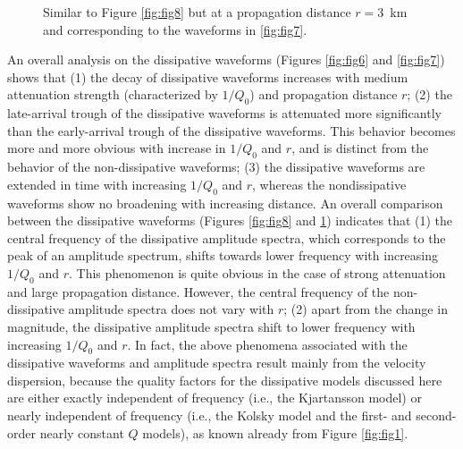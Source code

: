 \documentclass[article]{./macros/elsarticle_qh}
\begin{document}
\begin{figure}[H]
\centering
{}
\caption{
Similar to Figure \ref{fig:fig8} but at a propagation distance $r=3$~km and corresponding to the waveforms in \ref{fig:fig7}. 
}
\label{fig:fig9}
\end{figure}

An overall analysis on the dissipative waveforms (Figures \ref{fig:fig6} and \ref{fig:fig7}) shows that (1) the decay of dissipative waveforms increases with medium attenuation strength (characterized by $1/Q_{0}$) and propagation distance $r$; (2) the late-arrival trough of the dissipative waveforms is attenuated more significantly than the early-arrival trough of the dissipative waveforms. This behavior becomes more and more obvious with increase in $1/Q_{0}$ and $r$, and is distinct from the behavior of the non-dissipative waveforms; (3) the dissipative waveforms are extended in time with increasing $1/Q_{0}$ and $r$, whereas the nondissipative waveforms show no broadening with increasing distance. An overall comparison between the dissipative waveforms (Figures \ref{fig:fig8} and \ref{fig:fig9}) indicates that (1) the central frequency of the dissipative amplitude spectra, which corresponds to the peak of an amplitude spectrum, shifts towards lower frequency with increasing $1/Q_{0}$ and $r$. This phenomenon is quite obvious in the case of strong attenuation and large propagation distance. However, the central frequency of the non-dissipative amplitude spectra does not vary with $r$; (2) apart from the change in magnitude, the dissipative amplitude spectra shift to lower frequency with increasing $1/Q_{0}$ and $r$. In fact, the above phenomena associated with the dissipative waveforms and amplitude spectra result mainly from the velocity dispersion, because the quality factors for the dissipative models discussed here are either exactly independent of frequency (i.e., the Kjartansson model) or nearly independent of frequency (i.e., the Kolsky model and the first- and second-order nearly constant $Q$ models), as known already from Figure \ref{fig:fig1}.
\end{document}

